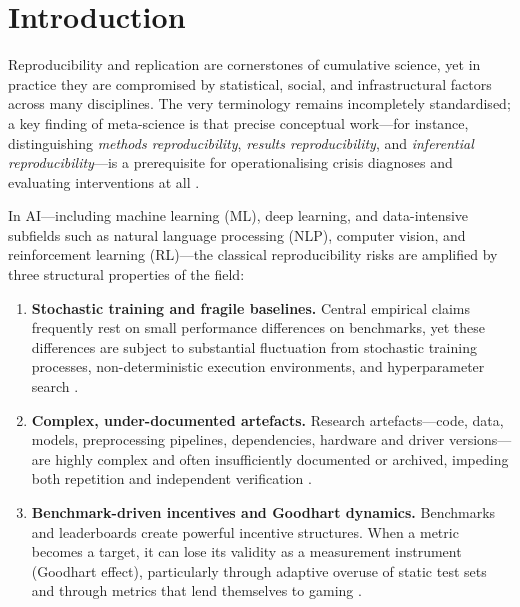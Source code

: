 \documentclass[12pt, a4paper]{article}
\begin{document}
\newpage
\tableofcontents
\newpage

\section{Introduction}
\label{sec:introduction}

Reproducibility and replication are cornerstones of cumulative science,
yet in practice they are compromised by statistical, social, and
infrastructural factors across many disciplines.  The very terminology
remains incompletely standardised; a key finding of meta-science is that
precise conceptual work---for instance, distinguishing
\emph{methods reproducibility}, \emph{results reproducibility}, and
\emph{inferential reproducibility}---is a prerequisite for
operationalising crisis diagnoses and evaluating interventions at all
\cite{Goodman2016}.

In AI---including machine learning (ML), deep learning, and
data-intensive subfields such as natural language processing (NLP),
computer vision, and reinforcement learning (RL)---the classical
reproducibility risks are amplified by three structural properties of
the field:

\begin{enumerate}[leftmargin=*]
  \item \textbf{Stochastic training and fragile baselines.}
    Central empirical claims frequently rest on small performance
    differences on benchmarks, yet these differences are subject to
    substantial fluctuation from stochastic training processes,
    non-deterministic execution environments, and hyperparameter search
    \cite{Henderson2018,Bouthillier2021}.

  \item \textbf{Complex, under-documented artefacts.}
    Research artefacts---code, data, models, preprocessing pipelines,
    dependencies, hardware and driver versions---are highly complex and
    often insufficiently documented or archived, impeding both
    repetition and independent verification
    \cite{Peng2011,Stodden2016,Gundersen2020}.

  \item \textbf{Benchmark-driven incentives and Goodhart dynamics.}
    Benchmarks and leaderboards create powerful incentive structures.
    When a metric becomes a target, it can lose its validity as a
    measurement instrument (Goodhart effect), particularly through
    adaptive overuse of static test sets and through metrics that lend
    themselves to gaming \cite{Hsia2024,Raji2021}.
\end{enumerate}
\end{document}
